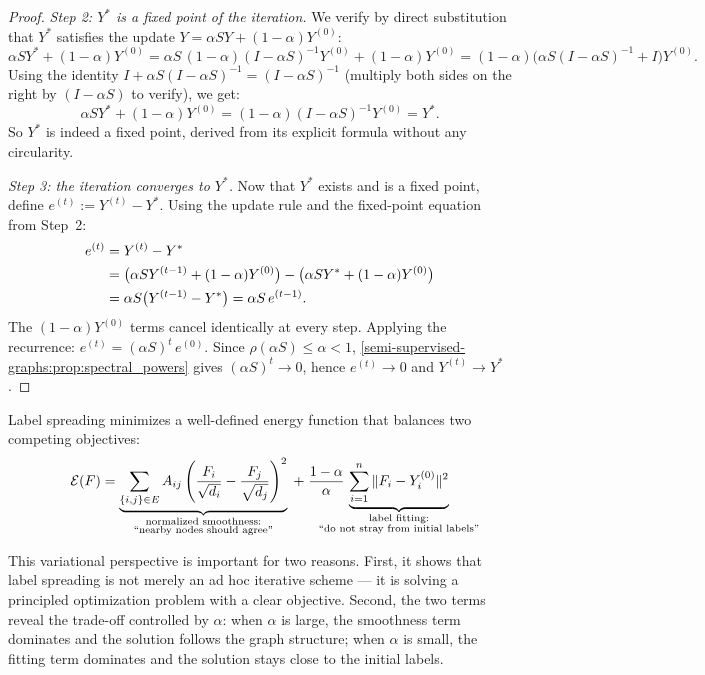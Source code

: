 \begin{notechapter}
\begin{proof}
\emph{Step 2: $Y^*$ is a fixed point of the iteration.}
We verify by direct substitution that $Y^*$ satisfies the update
$Y = \alpha S Y + (1-\alpha)Y^{(0)}$:
\[
  \alpha S Y^* + (1-\alpha)Y^{(0)}
  = \alpha S\,(1-\alpha)(I-\alpha S)^{-1}Y^{(0)} + (1-\alpha)Y^{(0)}
  = (1-\alpha)\bigl(\alpha S(I-\alpha S)^{-1} + I\bigr)Y^{(0)}.
\]
Using the identity $I + \alpha S(I - \alpha S)^{-1} = (I - \alpha S)^{-1}$
(multiply both sides on the right by $(I - \alpha S)$ to verify), we get:
\[
  \alpha S Y^* + (1-\alpha)Y^{(0)}
  = (1-\alpha)(I - \alpha S)^{-1}Y^{(0)} = Y^*.
\]
So $Y^*$ is indeed a fixed point, derived from its explicit formula without
any circularity.

\emph{Step 3: the iteration converges to $Y^*$.}
Now that $Y^*$ exists and is a fixed point, define $e^{(t)} := Y^{(t)} - Y^*$.
Using the update rule and the fixed-point equation from Step~2:
\begin{align}
e^{(t)} &= Y^{(t)} - Y^* \notag\\
&= \bigl(\alpha S Y^{(t-1)} + (1-\alpha)Y^{(0)}\bigr)
 - \bigl(\alpha S Y^* + (1-\alpha)Y^{(0)}\bigr) \notag\\
&= \alpha S\bigl(Y^{(t-1)} - Y^*\bigr) = \alpha S\,e^{(t-1)}.
\end{align}
The $(1-\alpha)Y^{(0)}$ terms cancel identically at every step. Applying the
recurrence: $e^{(t)} = (\alpha S)^t\,e^{(0)}$. Since $\rho(\alpha S) \leq
\alpha < 1$, \cref{semi-supervised-graphs:prop:spectral_powers} gives $(\alpha S)^t \to 0$,
hence $e^{(t)} \to 0$ and $Y^{(t)} \to Y^*$.
\end{proof}

\begin{theorem}
\label{semi-supervised-graphs:thm:ls_energy}
Label spreading minimizes a well-defined energy function that balances two
competing objectives:
\begin{equation}
\mathcal{E}(F) =
\underbrace{\sum_{\{i,j\}\in E} A_{ij}\left(\frac{F_i}{\sqrt{d_i}} -
\frac{F_j}{\sqrt{d_j}}\right)^2}_{\mathclap{\substack{
    \text{normalized smoothness:}\\
    \text{``nearby nodes should agree''}}}} \; + \; \frac{1-\alpha}{\alpha}\,
\underbrace{\sum_{i=1}^n \|F_i - Y_i^{(0)}\|^2}_{\mathclap{\substack{
    \text{label fitting:}\\
    \text{``do not stray from initial labels''}}}}
\end{equation}
\end{theorem}

This variational perspective is important for two reasons. First, it shows
that label spreading is not merely an ad hoc iterative scheme --- it is solving
a principled optimization problem with a clear objective. Second, the two
terms reveal the trade-off controlled by $\alpha$: when $\alpha$ is large, the
smoothness term dominates and the solution follows the graph structure; when
$\alpha$ is small, the fitting term dominates and the solution stays close to
the initial labels.


\end{notechapter}
